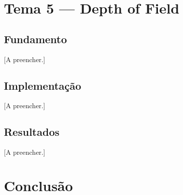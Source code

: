 \documentclass[11pt,a4paper]{article}
\begin{document}

\section{Tema 5 --- Depth of Field}
\label{sec:dof}


\subsection{Fundamento}


[A preencher.]

\subsection{Implementação}


[A preencher.]

\subsection{Resultados}


[A preencher.]


\section{Conclusão}
\end{document}
